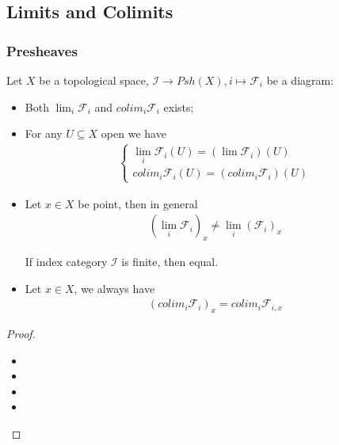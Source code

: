 \documentclass[Total.tex]{subfiles}
\begin{document}
			\subsection{Limits and Colimits}
			
				\subsubsection{Presheaves}
					\begin{lemma}
						Let $X$ be a topological space, $\mathcal{I}\rightarrow Psh(X),i\mapsto \mathcal{F}_i$ be a diagram:
						\begin{itemize}
							\item Both $\lim_i \mathcal{F}_i$ and $colim_i \mathcal{F}_i$ exists;
							\item For any $U\subseteq X$ open we have
							\begin{gather*}
								\begin{cases}
									\lim_i \mathcal{F}_i(U)=(\lim \mathcal{F}_i)(U)\\
									colim_i\mathcal{F}_i (U)=(colim_i \mathcal{F}_i)(U)
								\end{cases}
							\end{gather*}
							\item Let $x\in X$ be point, then in general
							\begin{gather*}
								(\lim_i \mathcal{F}_i)_x\not= \lim_i (\mathcal{F}_i)_x
							\end{gather*}
							
							If index category $\mathcal{I}$ is finite, then equal.
							\item Let $x\in X$, we always have
							\begin{gather*}
								(colim_i \mathcal{F}_i)_x=colim_i \mathcal{F}_{i,x}
							\end{gather*}
						\end{itemize}
					\end{lemma}
					\begin{proof}
						\begin{itemize}
							\item 
							\item 
							\item 
							\item 
						\end{itemize}
					\end{proof}
\end{document}
